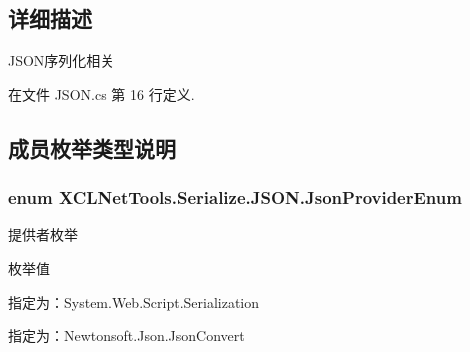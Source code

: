 \subsection{详细描述}
J\+S\+O\+N序列化相关 



在文件 J\+S\+O\+N.\+cs 第 16 行定义.



\subsection{成员枚举类型说明}
\subsubsection[{\texorpdfstring{Json\+Provider\+Enum}{JsonProviderEnum}}]{\setlength{\rightskip}{0pt plus 5cm}enum {\bf X\+C\+L\+Net\+Tools.\+Serialize.\+J\+S\+O\+N.\+Json\+Provider\+Enum}\hspace{0.3cm}{\ttfamily [strong]}}\hypertarget{class_x_c_l_net_tools_1_1_serialize_1_1_j_s_o_n_acb00f7258e4dedfaa0cec15ce9335a31}{}\label{class_x_c_l_net_tools_1_1_serialize_1_1_j_s_o_n_acb00f7258e4dedfaa0cec15ce9335a31}


提供者枚举 

\begin{Desc}
\item[枚举值]\par
\begin{description}
\item[{\em 
System\+Web\hypertarget{class_x_c_l_net_tools_1_1_serialize_1_1_j_s_o_n_acb00f7258e4dedfaa0cec15ce9335a31a67a1b1b70420ea0e3be332a9dedcb83e}{}\label{class_x_c_l_net_tools_1_1_serialize_1_1_j_s_o_n_acb00f7258e4dedfaa0cec15ce9335a31a67a1b1b70420ea0e3be332a9dedcb83e}
}]指定为：\+System.\+Web.\+Script.\+Serialization \item[{\em 
Newtonsoft\hypertarget{class_x_c_l_net_tools_1_1_serialize_1_1_j_s_o_n_acb00f7258e4dedfaa0cec15ce9335a31a3dae1400047ce0f8033b4d8f2815fc92}{}\label{class_x_c_l_net_tools_1_1_serialize_1_1_j_s_o_n_acb00f7258e4dedfaa0cec15ce9335a31a3dae1400047ce0f8033b4d8f2815fc92}
}]指定为：\+Newtonsoft.\+Json.\+Json\+Convert \end{description}
\end{Desc}



